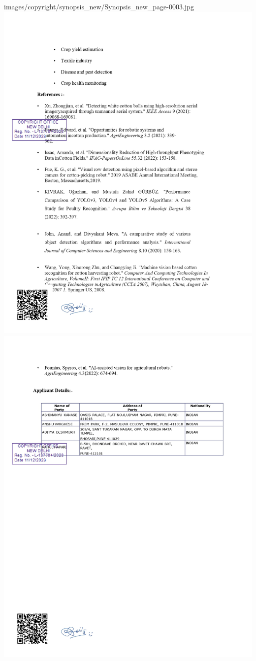 \documentclass[12pt,a4paper]{report}
\begin{document}
{images/copyright/synopsis_new/Synopsis_new_page-0003.jpg}
\newpage
\includegraphics[scale=0.7]
{images/copyright/synopsis_new/Synopsis_new_page-0004.jpg}
\newpage
\includegraphics[scale=0.7]
{images/copyright/synopsis_new/Synopsis_new_page-0005.jpg}
\newpage
\end{document}
